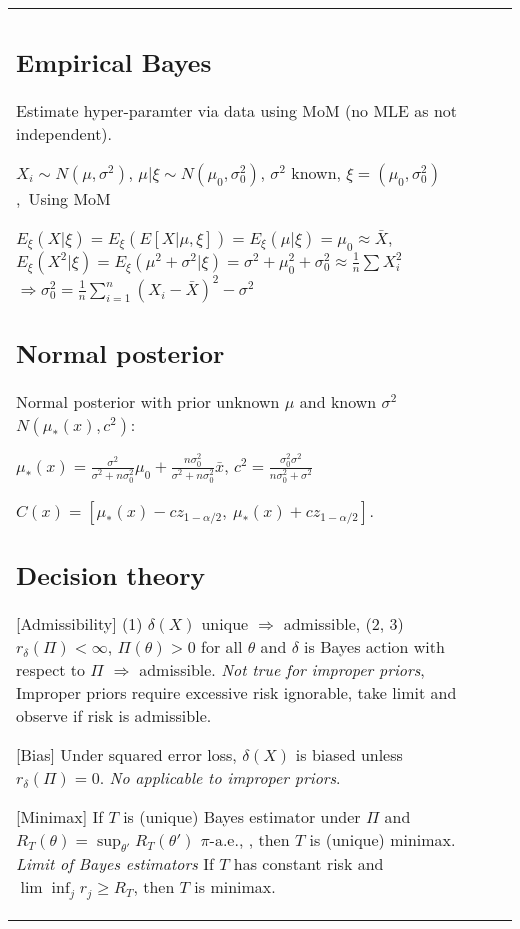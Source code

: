 \begin{tabulary}{\textwidth}{l || L}


	\subsection{Empirical Bayes}
	Estimate hyper-paramter via data using MoM (no MLE as not independent).

	$X_i\sim N(\mu, \sigma^2)$,\; $\mu|\xi \sim N(\mu_0, \sigma_0^2)$,\;
	$\sigma^2$ known,\; $\xi = (\mu_0, \sigma_0^2)$,\ Using MoM

	$E_\xi(X|\xi) = E_\xi(E[X|\mu, \xi]) = E_\xi(\mu|\xi) = \mu_0 \approx \bar X$,\;
	$E_\xi(X^2|\xi) = E_\xi(\mu^2 + \sigma^2 | \xi) = \sigma^2 + \mu_0^2 +
		\sigma_0^2 \approx \frac{1}{n} \sum X_i^2$
	$\Rightarrow \sigma_0^2 = \frac{1}{n}\sum_{i=1}^n (X_i - \bar X)^2
		-\sigma^2$

	\subsection{Normal posterior}

	Normal posterior with prior unknown $\mu$ and known $\sigma^2$ $N(\mu_*(x), c^2)$:

	$\mu_*(x) = \frac{\sigma^2}{\sigma^2 + n\sigma_0^2} \mu_0 + \frac{n\sigma_0^2}{\sigma^2 + n\sigma_0^2} \bar{x}$,
	$c^2 = \frac{\sigma_0^2\sigma^2}{n\sigma_0^2 + \sigma^2}$

	$C(x) = [\mu_*(x) - cz_{1-\alpha/2},~\mu_*(x) + cz_{1-\alpha/2}]$.

	\subsection{Decision theory}

	[Admissibility]
	(1) $\delta(X)$ unique $\Rightarrow$ admissible,\;
	(2, 3) $r_{\delta}(\Pi) < \infty$, $\Pi(\theta) > 0$ for all $\theta$
	and $\delta$ is Bayes action with respect to $\Pi$ $\Rightarrow$ admissible.
	\textit{Not true for improper priors}, Improper priors require excessive risk
	ignorable, take limit and observe if risk is admissible.

		[Bias]
	Under squared error loss, $\delta(X)$ is biased unless $r_\delta(\Pi) = 0$.
	\textit{No applicable to improper priors}.

	[Minimax]
	If $T$ is (unique) Bayes estimator under $\Pi$ and
	$R_T(\theta) = \sup_{\theta'} R_T(\theta')$ $\pi\text{-a.e.}$,
	, then $T$ is (unique) minimax.
	\textit{Limit of Bayes estimators} If $T$ has constant risk and
	$\lim\inf_j r_j \geq R_T$, then $T$ is minimax.

\end{tabulary}

